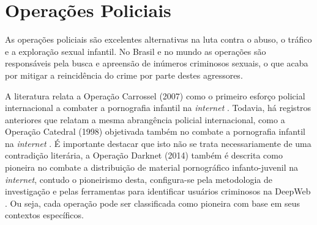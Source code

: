 





\section{Operações Policiais}\label{sec:op}

As operações policiais são excelentes alternativas na luta contra o abuso, o tráfico e a exploração sexual infantil. No Brasil e no mundo as operações são responsáveis pela busca e apreensão de inúmeros criminosos sexuais, o que acaba por mitigar a reincidência do crime por parte destes agressores. 

A literatura relata a Operação Carrossel (2007) como o primeiro esforço policial internacional a combater a pornografia infantil na \textit{internet} \cite{lowenkron2014all}. Todavia, há registros anteriores que relatam a mesma abrangência policial internacional, como a Operação Catedral (1998) objetivada também no combate a pornografia infantil na \textit{internet} \cite{Barrot2008, jesus2006anti}. É importante destacar que isto não se trata necessariamente de uma contradição literária, a Operação Darknet (2014) também é descrita como pioneira no combate a distribuição de material pornográfico infanto-juvenil na \textit{internet}, contudo o pioneirismo desta, configura-se pela metodologia de investigação e pelas ferramentas para identificar usuários criminosos na DeepWeb \cite{tonello2018pedofilia}. Ou seja, cada operação pode ser classificada como pioneira com base em seus contextos específicos. 


